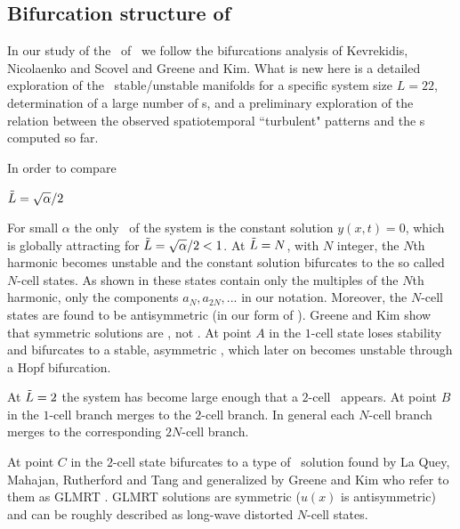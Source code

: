 \subsection{Bifurcation structure of \KS}
\label{sec:KSlit}
%

In our study of the \eqva\ of
\KSe\ we follow the bifurcations analysis of
Kevrekidis, Nicolaenko and Scovel 
and
Greene and Kim. What is new here is
a detailed exploration of the \eqva\ stable/unstable manifolds
for a specific system size $L = 22$, determination
of a large number of \rpo s, and a preliminary
exploration of the relation between the
observed spatiotemporal ``turbulent" patterns and
the \rpo s computed so far.

In order to compare 

$\tilde{L}=\sqrt{\alpha}/2$

For small $\alpha$ the only \eqv\ of the system is the constant solution $y(x,t)=0$,
which is globally attracting 
for $\tilde{L}=\sqrt{\alpha}/2<1$. At $\tilde{L}=N$, with $N$ integer, 
the $N$th harmonic becomes unstable and the constant solution
bifurcates to the so called $N$-cell states. 
As shown in  these states contain only the multiples of the $N$th
harmonic, {\ie} only the components $a_N,a_{2N},...$ in our notation.
Moreover, the $N$-cell states are found to be antisymmetric (in our form of \KSe).
Greene and Kim show that symmetric solutions are \eqva, not \reqva. 
At point $A$ in 
the $1$-cell state loses stability
and bifurcates to a stable, 
asymmetric \reqv, which later on becomes unstable through a Hopf bifurcation. 

At $\tilde{L}=2$ the system has become large enough 
that a $2$-cell \eqv\ appears. 
At point $B$ in 
the $1$-cell branch merges to the $2$-cell branch. 
In general each $N$-cell branch merges to the corresponding $2N$-cell branch.

At point $C$ in 
the $2$-cell state bifurcates to a type of 
\eqv\ solution
found by La Quey, Mahajan, Rutherford and Tang and generalized by Greene and Kim who refer to them as GLMRT \eqva. GLMRT solutions are symmetric 
($u(x)$ is antisymmetric)
and can be roughly described as long-wave distorted $N$-cell states.

